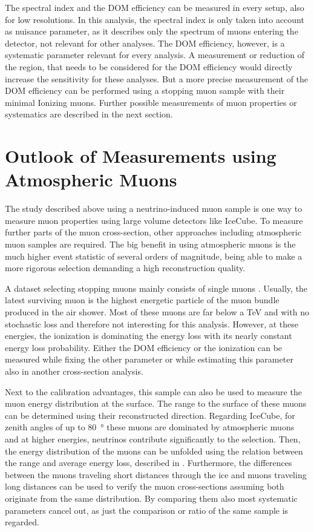 The spectral index and the DOM efficiency can be measured in every setup, also for low resolutions.
In this analysis, the spectral index is only taken into account as nuisance parameter, as it describes only the spectrum of muons entering the detector, not relevant for other analyses.
The DOM efficiency, however, is a systematic parameter relevant for every analysis.
A measurement or reduction of the region, that needs to be considered for the DOM efficiency would directly increase the sensitivity for these analyses.
But a more precise measurement of the DOM efficiency can be performed using a stopping muon sample with their minimal Ionizing muons.
Further possible measurements of muon properties or systematics are described in the next section.

%

\section{Outlook of Measurements using Atmospheric Muons}

The study described above using a neutrino-induced muon sample is one way to measure muon properties using large volume detectors like IceCube.
To measure further parts of the muon cross-section, other approaches including atmospheric muon samples are required.
The big benefit in using atmospheric muons is the much higher event statistic of several orders of magnitude, being able to make a more rigorous selection demanding a high reconstruction quality.

A dataset selecting stopping muons mainly consists of single muons \cite{Hoinka17Master, Ninfa19Master}.
Usually, the latest surviving muon is the highest energetic particle of the muon bundle produced in the air shower.
Most of these muons are far below a TeV and with no stochastic loss and therefore not interesting for this analysis.
However, at these energies, the ionization is dominating the energy loss with its nearly constant energy loss probability.
Either the DOM efficiency or the ionization can be measured while fixing the other parameter or while estimating this parameter also in another cross-section analysis.

Next to the calibration advantages, this sample can also be used to measure the muon energy distribution at the surface.
The range to the surface of these muons can be determined using their reconstructed direction.
Regarding IceCube, for zenith angles of up to \SI{80}{\degree} these muons are dominated by atmospheric muons and at higher energies, neutrinos contribute significantly to the selection.
Then, the energy distribution of the muons can be unfolded using the relation between the range and average energy loss, described in .
Furthermore, the differences between the muons traveling short distances through the ice and muons traveling long distances can be used to verify the muon cross-sections assuming both originate from the same distribution.
By comparing them also most systematic parameters cancel out, as just the comparison or ratio of the same sample is regarded.


